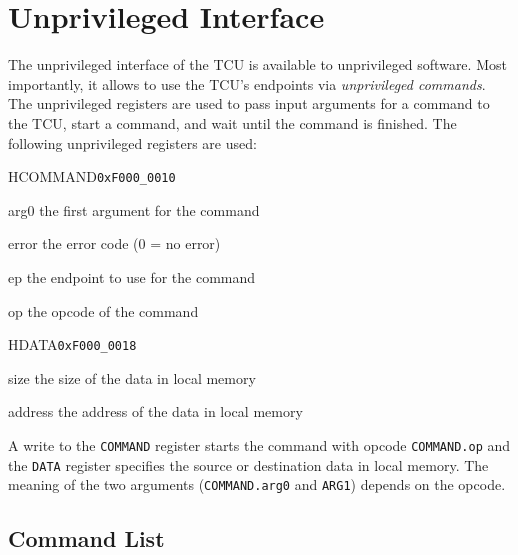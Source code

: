 \chapter{Unprivileged Interface}

The unprivileged interface of the TCU is available to unprivileged software. Most importantly, it
allows to use the TCU's endpoints via \emph{unprivileged commands}. The unprivileged registers are
used to pass input arguments for a command to the TCU, start a command, and wait until the command
is finished. The following unprivileged registers are used:

\begin{register}{H}{COMMAND}{\texttt{0xF000\_0010}}
  \regnewline%
  \begin{regdesc}\begin{reglist}
    \item[arg0] the first argument for the command
    \item[error] the error code (0 = no error)
    \item[ep] the endpoint to use for the command
    \item[op] the opcode of the command
  \end{reglist}\end{regdesc}
\end{register}

\begin{register}{H}{DATA}{\texttt{0xF000\_0018}}
  \regnewline%
  \begin{regdesc}\begin{reglist}
    \item[size] the size of the data in local memory
    \item[address] the address of the data in local memory
  \end{reglist}\end{regdesc}
\end{register}

\noindent A write to the \texttt{COMMAND} register starts the command with opcode
\texttt{COMMAND.op} and the \texttt{DATA} register specifies the source or destination data in local
memory. The meaning of the two arguments (\texttt{COMMAND.arg0} and \texttt{ARG1}) depends on the
opcode.

\section{Command List}

